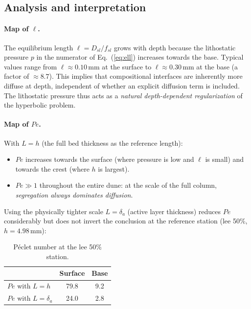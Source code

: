 \documentclass[12pt, a4paper]{article}
\begin{document}
\subsection*{Analysis and interpretation}

\paragraph{Map of $\ell$.}
The equilibrium length $\ell = D_{sl}/f_{sl}$ grows with depth because the
lithostatic pressure $p$ in the numerator of Eq.~(\ref{eq:ell}) increases
towards the base. Typical values range from
$\ell \approx 0.10$\,mm at the surface to $\ell \approx 0.30$\,mm at the
base (a factor of $\approx 8.7$). This implies that compositional interfaces
are inherently more diffuse at depth, independent of whether an explicit
diffusion term is included. The lithostatic pressure thus acts as a
\emph{natural depth-dependent regularization} of the hyperbolic problem.

\paragraph{Map of $Pe$.}
With $L = h$ (the full bed thickness as the reference length):
\begin{itemize}
    \item $Pe$ increases towards the surface (where pressure is low and
          $\ell$ is small) and towards the crest (where $h$ is largest).
    \item $Pe \gg 1$ throughout the entire dune: at the scale of the
          full column, \emph{segregation always dominates diffusion}.
\end{itemize}

Using the physically tighter scale $L = \delta_a$ (active layer
thickness) reduces $Pe$ considerably but does not invert the conclusion
at the reference station (lee 50\%, $h = 4.98$\,mm):

\begin{table}[H]
    \centering
    \begin{tabular}{lcc}
        \toprule
        & Surface & Base \\
        \midrule
        $Pe$ with $L = h$        & 79.8 & 9.2 \\
        $Pe$ with $L = \delta_a$ & 24.0 & 2.8 \\
        \bottomrule
    \end{tabular}
    \caption{Péclet number at the lee 50\% station.}
    \label{tab:Pe}
\end{table}
\end{document}

